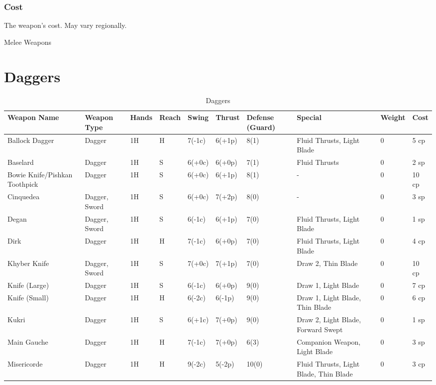 \documentclass[oneside,11pt,english]{book}
\begin{document}
\subsubsection{Cost}
The weapon’s cost. May vary regionally.

Melee Weapons %

\section{Daggers} %
\begin{longtabu} to 1\linewidth {X[2,l]XX[-1,c]X[-1,c]XXX[-1,c]X[2,l]X[-3,c]X[-3,r]}
	\caption{Daggers}
	\label{tab:Daggers List}\\
Weapon Name						&Weapon Type	&Hands&Reach&Swing&Thrust&Defense (Guard)&Special						&Weight	&Cost\\\toprule\endhead
Ballock Dagger					&Dagger			&1H	&H	&7(-1c)	&6(+1p)	&8(1)	&Fluid Thrusts, Light Blade				&0	&5 cp\\
Baselard						&Dagger			&1H	&S	&6(+0c)	&6(+0p)	&7(1)	&Fluid Thrusts							&0	&2 sp\\
Bowie Knife/Pishkan Toothpick	&Dagger			&1H	&S	&6(+0c)	&6(+1p)	&8(1)	&-										&0	&10 cp\\
Cinquedea						&Dagger, Sword	&1H	&S	&6(+0c)	&7(+2p)	&8(0)	&-										&0	&3 sp\\
Degan							&Dagger, Sword	&1H	&S	&6(-1c)	&6(+1p)	&7(0)	&Fluid Thrusts, Light Blade				&0	&1 sp\\
Dirk							&Dagger			&1H	&H	&7(-1c)	&6(+0p)	&7(0)	&Fluid Thrusts, Light Blade				&0	&4 cp\\
Khyber Knife					&Dagger, Sword	&1H	&S	&7(+0c)	&7(+1p)	&7(0)	&Draw 2, Thin Blade						&0	&10 cp\\
Knife (Large)					&Dagger			&1H	&S	&6(-1c)	&6(+0p)	&9(0)	&Draw 1, Light Blade					&0	&7 cp\\
Knife (Small)					&Dagger			&1H	&H	&6(-2c)	&6(-1p)	&9(0)	&Draw 1, Light Blade, Thin Blade		&0	&6 cp\\
Kukri							&Dagger			&1H	&S	&6(+1c)	&7(+0p)	&9(0)	&Draw 2, Light Blade, Forward Swept		&0	&1 sp\\
Main Gauche						&Dagger			&1H	&H	&7(-1c)	&7(+0p)	&6(3)	&Companion Weapon, Light Blade			&0	&3 sp\\
Misericorde						&Dagger			&1H	&H	&9(-2c)	&5(-2p)	&10(0)	&Fluid Thrusts, Light Blade, Thin Blade	&0	&3 cp\\

\end{longtabu}
\end{document}
